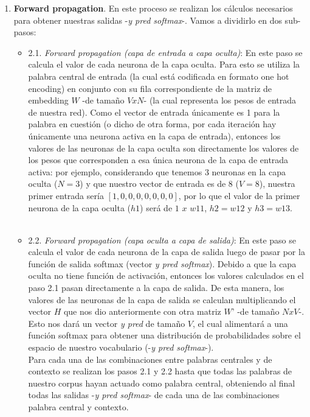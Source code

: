 \documentclass[12pt,a4paper]{article}
\begin{document}
\begin{sloppypar}
\begin{enumerate}
\item \textbf{Forward propagation}. En este proceso se realizan los cálculos necesarios para obtener nuestras salidas -\textit{y pred softmax}-. Vamos a dividirlo en dos sub-pasos:

\begin{itemize}

\item 2.1. \textit{Forward propagation (capa de entrada a capa oculta)}: En este paso se calcula el valor de cada neurona de la capa oculta. Para esto se utiliza la palabra central de entrada (la cual está codificada en formato one hot encoding) en conjunto con su fila correspondiente de la matriz de embedding $W$ -de tamaño $V x N$- (la cual representa los pesos de entrada de nuestra red). Como el vector de entrada únicamente es 1 para la palabra en cuestión (o dicho de otra forma, por cada iteración hay únicamente una neurona activa en la capa de entrada), entonces los valores de las neuronas de la capa oculta son directamente los valores de los pesos que corresponden a esa única neurona de la capa de entrada activa: por ejemplo, considerando que tenemos 3 neuronas en la capa oculta ($N=3$) y que nuestro vector de entrada es de 8 ($V=8$), nuestra primer entrada sería $[1,0,0,0,0,0,0,0]$, por lo que el valor de la primer neurona de la capa oculta ($h1$) será de $1$ $x$ $w11$, $h2 = w12$ y $h3 = w13$.\\ \\

\item 2.2. \textit{Forward propagation (capa oculta a capa de salida)}: En este paso se calcula el valor de cada neurona de la capa de salida luego de pasar por la función de salida softmax (vector \textit{y pred softmax}). Debido a que la capa oculta no tiene función de activación, entonces los valores calculados en el paso 2.1 pasan directamente a la capa de salida. De esta manera, los valores de las neuronas de la capa de salida se calculan multiplicando el vector $H$ que nos dio anteriormente con otra matriz $W’$ -de tamaño $N x V$-. Esto nos dará un vector \textit{y pred} de tamaño $V$, el cual alimentará a una función softmax para obtener una distribución de probabilidades sobre el espacio de nuestro vocabulario (-\textit{y pred softmax}-). 
\\

Para cada una de las combinaciones entre palabras centrales y de contexto se realizan los pasos 2.1 y 2.2 hasta que todas las palabras de nuestro corpus hayan actuado como palabra central, obteniendo al final todas las salidas -\textit{y pred softmax}- de cada una de las combinaciones palabra central y contexto. 


\end{itemize}
\end{enumerate}
\end{sloppypar}
\end{document}
